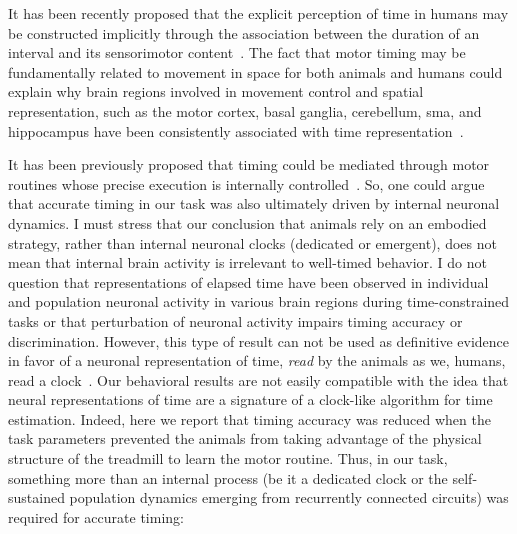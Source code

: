 It has been recently proposed that the explicit perception of time in humans may be constructed implicitly through the association between the duration of an interval and its sensorimotor content~\cite{Coull2018}.
The fact that motor timing may be fundamentally related to movement in space for both animals and humans could explain why brain regions involved in movement control and spatial representation, such as the motor cortex, basal ganglia, cerebellum, \gls{sma}, and hippocampus have been consistently associated with time representation~\cite{Pouthas2005, Kraus2013Neuron, Bakhurin2017JNeuro, Morillon2017PNAS, Gu2018NeuroLearnMem, Mello2015, Schubotz2000}.

\par
It has been previously proposed that timing could be mediated through motor routines whose precise execution is internally controlled~\cite{Killeen1988,Dragoi2003, Staddon1999}.
So, one could argue that accurate timing in our task was also ultimately driven by internal neuronal dynamics.
I must stress that our conclusion that animals rely on an embodied strategy, rather than internal neuronal clocks (dedicated or emergent), does not mean that internal brain activity is irrelevant to well-timed behavior.
I do not question that representations of elapsed time have been observed in individual and population neuronal activity in various brain regions during time-constrained tasks or that perturbation of neuronal activity impairs timing accuracy or discrimination.
However, this type of result can not be used as definitive evidence in favor of a neuronal representation of time, \emph{read} by the animals as we, humans, read a clock~\cite{Krakauer2017Neuron, Buzsaki2017SciRev, Buzsaki2018TICS}.
Our behavioral results are not easily compatible with the idea that neural representations of time are a signature of a clock-like algorithm for time estimation.
Indeed, here we report that timing accuracy was reduced when the task parameters prevented the animals from taking advantage of the physical structure of the treadmill to learn the motor routine.
Thus, in our task, something more than an internal process (be it a dedicated clock or the self-sustained population dynamics emerging from recurrently connected circuits) was required for accurate timing:
